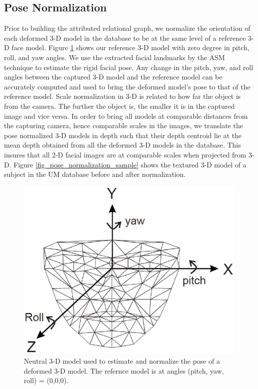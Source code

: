 \subsection{Pose Normalization}
Prior to building the attributed relational graph, we normalize the
orientation of each deformed 3-D model in the database to be at the
same level of a reference 3-D face model. Figure \ref{fig_pose_3-D}
shows our reference 3-D model with zero degree in pitch, roll, and
yaw angles. We use the extracted facial landmarks by the ASM
technique to estimate the rigid facial pose. Any change in the
pitch, yaw, and roll angles between the captured 3-D model and the
reference model can be accurately computed and used to bring the
deformed model's pose to that of the reference model. Scale
normalization in 3-D is related to how far the object is from the
camera. The further the object is, the smaller it is in the captured
image and vice versa. In order to bring all models at comparable
distances from the capturing camera, hence comparable scales in the
images, we translate the pose normalized 3-D models in depth such
that their depth centroid lie at the mean depth obtained from all
the deformed 3-D models in the database. This insures that all 2-D
facial images are at comparable scales when projected from 3-D.
Figure \ref{fig_pose_normalization_sample} shows the textured 3-D
model of a subject in the UM database before and after
normalization.
\begin{figure}[tbp]
\begin{center}
  \includegraphics[scale = .6]{./chapters/figures/neutral_3D_pose.eps}
  \caption{Neutral 3-D model used to estimate and normalize the pose of a deformed 3-D model.
  The refernce model is at angles (pitch, yaw, roll) = (0,0,0).}\label{fig_pose_3-D}
\end{center}
\end{figure}

